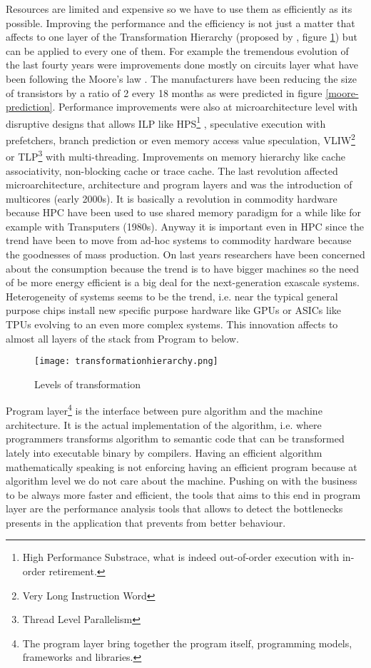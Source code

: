 Resources are limited and expensive so we have to use them as efficiently
as its possible. Improving the performance and the efficiency is not just a 
matter that affects to one
layer of the Transformation Hierarchy (proposed by
\cite{transformationHierarchy}, figure \ref{fig:transformation_hierarchy}) 
but can be applied to every one of them. For example the
tremendous evolution of the last fourty years were improvements done mostly on
circuits layer what have been following the Moore's law \cite{moore:1965}. The
manufacturers have been reducing the size of transistors by a ratio of 2 every
18 months as were predicted in figure \ref{moore-prediction}. Performance improvements 
were also at microarchitecture level with
disruptive designs that allows ILP like HPS\footnote{High Performance Substrace,
what is indeed out-of-order execution with in-order retirement.}
\cite{Patt:1985:HNM:18927.18916}, speculative execution with prefetchers, 
branch prediction or even memory access value speculation,
VLIW\footnote{Very Long Instruction Word} or TLP\footnote{Thread Level
Parallelism} with multi-threading. Improvements on memory hierarchy like cache 
associativity, non-blocking cache or trace cache. The last revolution affected 
 microarchitecture, architecture and program layers and was the introduction
of multicores (early 2000s). It is basically a revolution in commodity hardware because HPC
have been used to use shared memory paradigm for a while like for example with
Transputers (1980s). Anyway it is important even in HPC since the trend have
been to move from ad-hoc systems to commodity hardware because the goodnesses of
mass production. On last years researchers have been concerned about the
consumption because the trend is to have bigger machines so the need of be more
energy efficient is a big deal for the next-generation exascale systems.
Heterogeneity of systems seems to be the trend, i.e. near the typical general
purpose chips install new specific purpose hardware like GPUs or ASICs like
TPUs \cite{jouppi2017datacenter} evolving to an even more complex systems. This
innovation affects to almost all layers of the stack from Program to below. 

\begin{figure}
  \caption{Levels of transformation}
  \label{fig:transformation_hierarchy}
  \centering
    \texttt{[image: transformationhierarchy.png]}
\end{figure}

Program layer\footnote{The program layer bring together the program itself, 
programming models, frameworks and libraries.} is the interface between pure 
algorithm and the machine architecture. 
It is the actual implementation of the algorithm, i.e. where programmers
transforms algorithm to semantic code that can be transformed lately into
executable binary by compilers. Having an efficient algorithm mathematically 
speaking is not enforcing having an efficient program because at algorithm level 
we do not care about the machine. Pushing on with the business to be always more 
faster and efficient, the tools that aims to this end in program layer are the 
performance analysis tools that allows to detect the bottlenecks presents in the 
application that prevents from better behaviour.

